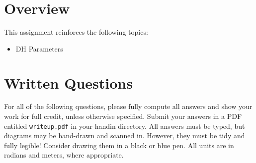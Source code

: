\documentclass{16384_doc}
\begin{document}
\maketitle
\tableofcontents

\section{Overview}
This assignment reinforces the following topics:
\begin{itemize}

\item DH Parameters

\end{itemize}

\newpage

\section{Written Questions}
For all of the following questions, please fully compute all answers and show
your work for full credit, unless otherwise specified. Submit your answers in a
PDF entitled \verb!writeup.pdf! in your handin directory.  All answers must be
typed, but diagrams may be hand-drawn and scanned in.  However, they must be
tidy and fully legible! Consider drawing them in a black or blue pen.  All units
are in radians and meters, where appropriate.
\end{document}
